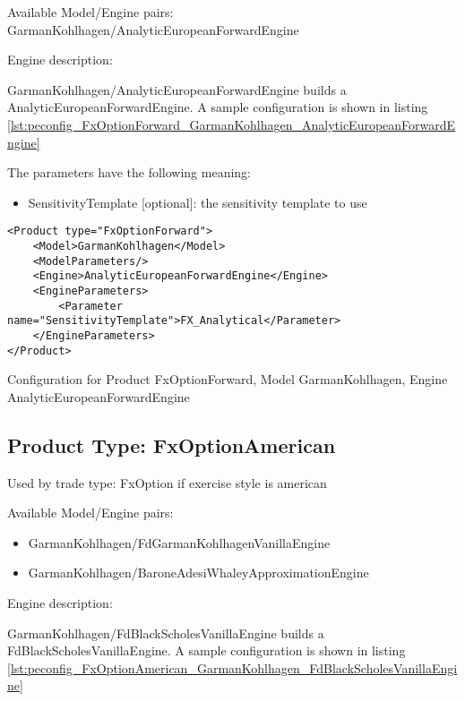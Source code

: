 Available Model/Engine pairs: GarmanKohlhagen/AnalyticEuropeanForwardEngine

Engine description:

GarmanKohlhagen/AnalyticEuropeanForwardEngine builds a AnalyticEuropeanForwardEngine. A sample configuration is shown in listing
\ref{lst:peconfig_FxOptionForward_GarmanKohlhagen_AnalyticEuropeanForwardEngine}

The parameters have the following meaning:

\begin{itemize}
\item SensitivityTemplate [optional]: the sensitivity template to use
\end{itemize}

\begin{longlisting}
\begin{verbatim}
<Product type="FxOptionForward">
    <Model>GarmanKohlhagen</Model>
    <ModelParameters/>
    <Engine>AnalyticEuropeanForwardEngine</Engine>
    <EngineParameters>
        <Parameter name="SensitivityTemplate">FX_Analytical</Parameter>
    </EngineParameters>
</Product>
\end{verbatim}
\caption{Configuration for Product FxOptionForward, Model GarmanKohlhagen, Engine AnalyticEuropeanForwardEngine}
\label{lst:peconfig_FxOptionForward_GarmanKohlhagen_AnalyticEuropeanForwardEngine}
\end{longlisting}

\subsection{Product Type: FxOptionAmerican}

Used by trade type: FxOption if exercise style is american

Available Model/Engine pairs:

\begin{itemize}
\item GarmanKohlhagen/FdGarmanKohlhagenVanillaEngine
\item GarmanKohlhagen/BaroneAdesiWhaleyApproximationEngine
\end{itemize}

Engine description:

GarmanKohlhagen/FdBlackScholesVanillaEngine builds a FdBlackScholesVanillaEngine. A sample configuration is shown in listing
\ref{lst:peconfig_FxOptionAmerican_GarmanKohlhagen_FdBlackScholesVanillaEngine}

